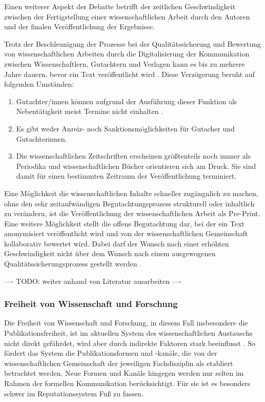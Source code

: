 Einen weiterer Aspekt der Debatte betrifft der zeitlichen Geschwindigkeit zwischen der Fertigstellung einer wissenschaftlichen Arbeit durch den Autoren und der finalen Veröffentlichung der Ergebnisse.

Trotz der Beschleunigung der Prozesse bei der Qualitätssicherung und Bewertung von wissenschaftlichen Arbeiten durch die Digitalisierung der Kommunikation zwischen Wissenschaftlern, Gutachtern und Verlagen kann es bis zu mehrere Jahre dauern, bevor ein Text veröffentlicht wird \cite{suchen}. Diese Verzögerung beruht auf folgenden Umständen:

\begin{enumerate}
\item Gutachter/innen können aufgrund der Ausführung dieser Funktion als Nebentätigkeit meist Termine nicht einhalten \cite{suchen}.
\item Es gibt weder Anreiz- noch Sanktionsmöglichkeiten für Gutacher und Gutachterinnen.
\item Die wissenschaftlichen Zeitschriften erscheinen größtenteils noch immer als Periodika und wissenschaftlichen Bücher orientieren sich am Druck. Sie sind damit für einen bestimmten Zeitraum der Veröffentlichung terminiert.
\end{enumerate}

Eine Möglichkeit die wissenschaftlichen Inhalte schneller zugängnlich zu machen, ohne den sehr zeitaufwändigen Begutachtungsprozess strukturell oder inhaltlich zu verändern, ist die Veröffentlichung der wissenschaftlichen Arbeit als Pre-Print. Eine weitere Möglichkeit stellt die offene Begutachtung dar, bei der ein Text anonymisiert veröffentlicht wird und von der wissenschaftlichen Gemeinschaft kollaborativ bewertet wird. Dabei darf der Wunsch nach einer erhöhten Geschwindigkeit nicht über dem Wunsch nach einem ausgewogenen Qualitätssicherungsprozess gestellt werden \cite{Beall_2012}.

---- TODO: weiter anhand von Literatur ausarbeiten ----

\subsubsection{Freiheit von Wissenschaft und Forschung}

Die Freiheit von Wissenschaft und Forschung, in diesem Fall insbesondere die Publikationsfreiheit, ist im aktuellen System des wissenschaftlichen Austauschs nicht direkt gefährdet, wird aber durch indirekte Faktoren stark beeinflusst \cite{suchen}. So fördert das System die Publikationsformen und -kanäle, die von der wissenschaftlichen Gemeinschaft der jeweiligen Fachdisziplin als etabliert betrachtet werden. Neue Formen und Kanäle hingegen werden nur selten im Rahmen der formellen Kommunikation berücksichtigt. Für sie ist es besonders schwer im Reputationssystem Fuß zu fassen.


